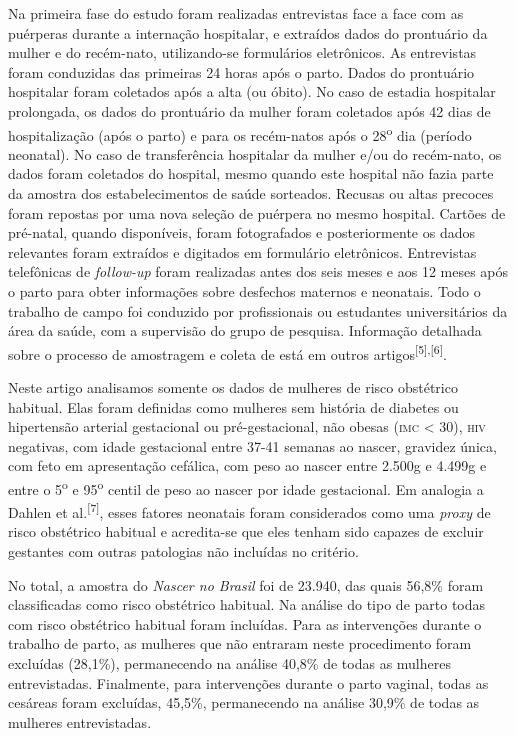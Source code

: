 \documentclass{article}
\begin{document}
Na primeira fase do estudo foram realizadas entrevistas face a face com as
puérperas durante a internação hospitalar, e extraídos dados do prontuário da
mulher e do recém-nato, utilizando-se formulários eletrônicos. As entrevistas
foram conduzidas das primeiras 24 horas após o parto. Dados do prontuário
hospitalar foram coletados após a alta (ou óbito). No caso de estadia hospitalar
prolongada, os dados do prontuário da mulher foram coletados após 42 dias de
hospitalização (após o parto) e para os recém-natos após o
28\textsuperscript{o}
dia (período neonatal). No caso de
transferência hospitalar da mulher e/ou do recém-nato, os dados foram coletados
do hospital, mesmo quando este hospital não fazia parte da amostra dos
estabelecimentos de saúde sorteados. Recusas ou altas precoces foram repostas
por uma nova seleção de puérpera no mesmo hospital. Cartões de pré-natal, quando
disponíveis, foram fotografados e posteriormente os dados relevantes foram
extraídos e digitados em formulário eletrônicos. Entrevistas telefônicas de
\textit{follow-up}
foram realizadas antes dos seis meses e aos 12
meses após o parto para obter informações sobre desfechos maternos e neonatais.
Todo o trabalho de campo foi conduzido por profissionais ou estudantes
universitários da área da saúde, com a supervisão do grupo de pesquisa.
Informação detalhada sobre o processo de amostragem e coleta de está em outros
artigos\textsuperscript{[}\textsuperscript{5}\textsuperscript{]}\textsuperscript{,}\textsuperscript{[}\textsuperscript{6}\textsuperscript{]}.

Neste artigo analisamos somente os dados de mulheres de risco obstétrico
habitual. Elas foram definidas como mulheres sem história de diabetes ou
hipertensão arterial gestacional ou pré-gestacional, não obesas (\textsc{imc} < 30),
\textsc{hiv} negativas, com idade gestacional entre 37-41 semanas ao nascer, gravidez
única, com feto em apresentação cefálica, com peso ao nascer entre 2.500g e
4.499g e entre o 5\textsuperscript{o}
e
95\textsuperscript{o}
centil de peso ao nascer por idade
gestacional. Em analogia a Dahlen et al.\textsuperscript{[}\textsuperscript{7}\textsuperscript{]}, esses fatores neonatais foram considerados como
uma \textit{proxy}
de risco obstétrico habitual e acredita-se que eles
tenham sido capazes de excluir gestantes com outras patologias não incluídas no
critério.

No total, a amostra do \textit{Nascer no Brasil}
foi de 23.940, das quais
56,8\% foram classificadas como risco obstétrico habitual. Na análise do tipo de
parto todas com risco obstétrico habitual foram incluídas. Para as intervenções
durante o trabalho de parto, as mulheres que não entraram neste procedimento
foram excluídas (28,1\%), permanecendo na análise 40,8\% de todas as mulheres
entrevistadas. Finalmente, para intervenções durante o parto vaginal, todas as
cesáreas foram excluídas, 45,5\%, permanecendo na análise 30,9\% de todas as
mulheres entrevistadas.
\end{document}
